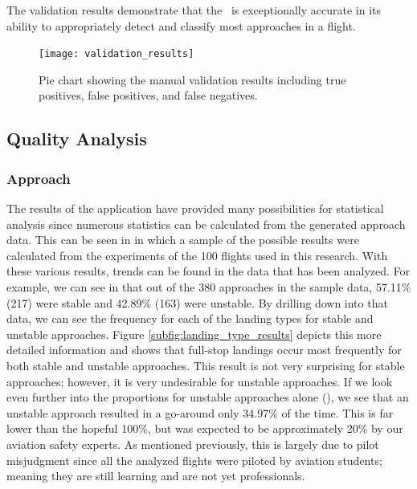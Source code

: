         The validation results demonstrate that the \toolname\ is exceptionally accurate in its ability to appropriately detect and classify most approaches in a flight.

        \begin{figure}
            \centering
            \texttt{[image: validation\_results]}
            \caption{Pie chart showing the manual validation results including true positives, false positives, and false negatives.}
            \label{fig:validation_results}
        \end{figure}
    
    
\subsection{Quality Analysis}


    \subsubsection{Approach}
    
    	The results of the application have provided many possibilities for statistical analysis since numerous statistics can be calculated from the generated approach data.  This can be seen in  in which a sample of the possible results were calculated from the experiments of the 100 flights used in this research.  With these various results, trends can be found in the data that has been analyzed.  For example, we can see in  that out of the 380 approaches in the sample data, 57.11\% (217) were stable and 42.89\% (163) were unstable.  By drilling down into that data, we can see the frequency for each of the landing types for stable and unstable approaches.  Figure \ref{subfig:landing_type_results} depicts this more detailed information and shows that full-stop landings occur most frequently for both stable and unstable approaches.  This result is not very surprising for stable approaches; however, it is very undesirable for unstable approaches.  If we look even further into the proportions for unstable approaches alone (), we see that an unstable approach resulted in a go-around only 34.97\% of the time.  This is far lower than the hopeful 100\%, but was expected to be approximately 20\% by our aviation safety experts.  As mentioned previously, this is largely due to pilot misjudgment since all the analyzed flights were piloted by aviation students; meaning they are still learning and are not yet professionals.
    
